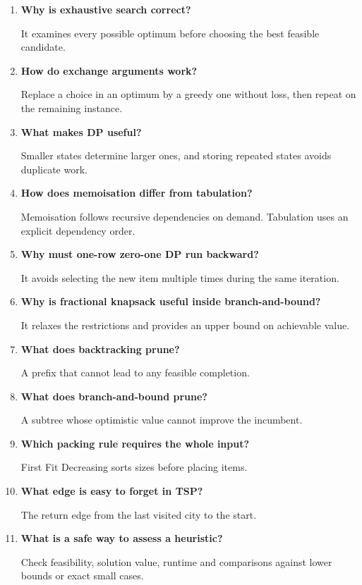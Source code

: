 \documentclass[12pt,a4paper]{article}
\newcommand{\Q}[1]{\textbf{#1}\par\noindent\ignorespaces}
\begin{document}
\begin{tcolorbox}[exambox, title={Frequently Asked / Viva Questions}]
\begin{enumerate}[topsep=0pt, label=\textbf{Q\arabic*.}, itemsep=5pt, leftmargin=*]
  \item \Q{Why is exhaustive search correct?}
    It examines every possible optimum before choosing the best feasible candidate.
  \item \Q{How do exchange arguments work?}
    Replace a choice in an optimum by a greedy one without loss, then repeat on the remaining instance.
  \item \Q{What makes DP useful?}
    Smaller states determine larger ones, and storing repeated states avoids duplicate work.
  \item \Q{How does memoisation differ from tabulation?}
    Memoisation follows recursive dependencies on demand. Tabulation uses an explicit dependency order.
  \item \Q{Why must one-row zero-one DP run backward?}
    It avoids selecting the new item multiple times during the same iteration.
  \item \Q{Why is fractional knapsack useful inside branch-and-bound?}
    It relaxes the restrictions and provides an upper bound on achievable value.
  \item \Q{What does backtracking prune?}
    A prefix that cannot lead to any feasible completion.
  \item \Q{What does branch-and-bound prune?}
    A subtree whose optimistic value cannot improve the incumbent.
  \item \Q{Which packing rule requires the whole input?}
    First Fit Decreasing sorts sizes before placing items.
  \item \Q{What edge is easy to forget in TSP?}
    The return edge from the last visited city to the start.
  \item \Q{What is a safe way to assess a heuristic?}
    Check feasibility, solution value, runtime and comparisons against lower bounds or exact small cases.
\end{enumerate}
\end{tcolorbox}
\end{document}
